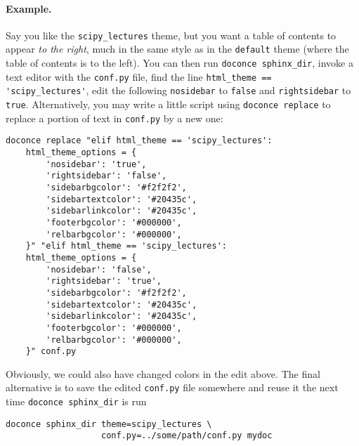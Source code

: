 \documentclass[%
oneside,                 %
final,                   %
10pt]{article}
\begin{document}
\paragraph{Example.}
Say you like the {\fontsize{10pt}{10pt}\Verb!scipy_lectures!} theme, but you want
a table of contents to appear \emph{to the right}, much in the same style
as in the {\fontsize{10pt}{10pt}\Verb!default!} theme (where the table of contents is to the left).
You can then run {\fontsize{10pt}{10pt}\Verb!doconce sphinx_dir!}, invoke a text editor with the
{\fontsize{10pt}{10pt}\Verb!conf.py!} file, find the line {\fontsize{10pt}{10pt}\Verb!html_theme == 'scipy_lectures'!},
edit the following {\fontsize{10pt}{10pt}\Verb!nosidebar!} to {\fontsize{10pt}{10pt}\Verb!false!} and {\fontsize{10pt}{10pt}\Verb!rightsidebar!} to {\fontsize{10pt}{10pt}\Verb!true!}.
Alternatively, you may write a little script using {\fontsize{10pt}{10pt}\Verb!doconce replace!}
to replace a portion of text in {\fontsize{10pt}{10pt}\Verb!conf.py!} by a new one:

\begin{verbatim}
doconce replace "elif html_theme == 'scipy_lectures':
    html_theme_options = {
        'nosidebar': 'true',
        'rightsidebar': 'false',
        'sidebarbgcolor': '#f2f2f2',
        'sidebartextcolor': '#20435c',
        'sidebarlinkcolor': '#20435c',
        'footerbgcolor': '#000000',
        'relbarbgcolor': '#000000',
    }" "elif html_theme == 'scipy_lectures':
    html_theme_options = {
        'nosidebar': 'false',
        'rightsidebar': 'true',
        'sidebarbgcolor': '#f2f2f2',
        'sidebartextcolor': '#20435c',
        'sidebarlinkcolor': '#20435c',
        'footerbgcolor': '#000000',
        'relbarbgcolor': '#000000',
    }" conf.py
\end{verbatim}
\noindent
Obviously, we could also have changed colors in the edit above.
The final alternative is to save the edited {\fontsize{10pt}{10pt}\Verb!conf.py!} file somewhere
and reuse it the next time {\fontsize{10pt}{10pt}\Verb!doconce sphinx_dir!} is run

\vspace{4pt}
\begin{Verbatim}[numbers=none,frame=lines,fontsize=\fontsize{9pt}{9pt},labelposition=topline,framesep=2.5mm,framerule=0.7pt]
doconce sphinx_dir theme=scipy_lectures \ 
                   conf.py=../some/path/conf.py mydoc
\end{Verbatim}
\end{document}
